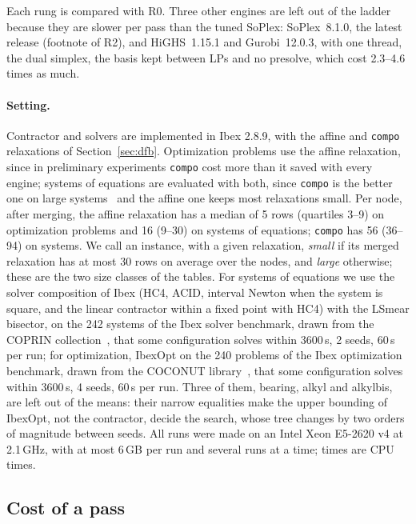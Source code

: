 \documentclass[11pt]{article}
\theoremstyle{definition}
\theoremstyle{remark}
\begin{document}
Each rung is compared with R0. Three other engines are left out of the
ladder because they are slower per pass than the tuned SoPlex: SoPlex~8.1.0,
the latest release (footnote of R2), and HiGHS~1.15.1 and Gurobi~12.0.3, with
one thread, the dual simplex, the basis kept between LPs and no presolve,
which cost 2.3--4.6 times as much.

\paragraph{Setting.}
Contractor and solvers are implemented in Ibex 2.8.9, with the affine and
\texttt{compo} relaxations of Section~\ref{sec:dfb}. Optimization
problems use the affine relaxation, since in preliminary experiments
\texttt{compo} cost more than it saved with every engine; systems of
equations are evaluated with both, since \texttt{compo} is the better one on
large systems~\cite{araya2025hybridizing} and the affine one keeps most
relaxations small.
Per node, after merging, the affine relaxation has a median of 5 rows
(quartiles 3--9) on optimization problems and 16 (9--30) on systems of
equations; \texttt{compo} has 56 (36--94) on systems. We call an instance, with a given
relaxation, \emph{small} if its merged relaxation has at most 30 rows on
average over the nodes, and \emph{large} otherwise; these are the two size
classes of the tables. For systems of
equations we use the solver composition of Ibex (HC4, ACID, interval Newton
when the system is square, and the linear contractor within a fixed point with
HC4) with the LSmear bisector, on the 242 systems of the Ibex solver benchmark,
drawn from the COPRIN collection~\cite{coprin},
that some configuration solves within 3600\,s, 2 seeds, 60\,s per run; for
optimization, IbexOpt on the 240 problems of the Ibex optimization benchmark,
drawn from the COCONUT library~\cite{shcherbina2003benchmarking},
that some configuration solves within 3600\,s, 4 seeds, 60\,s per run. Three
of them, bearing, alkyl and alkylbis, are left out of the means: their narrow
equalities make the upper bounding of IbexOpt, not the contractor, decide the
search, whose tree changes by two orders of magnitude between seeds. All runs
were made on an Intel Xeon E5-2620 v4 at 2.1\,GHz, with at most 6\,GB per run
and several runs at a time; times are CPU times.


\subsection{Cost of a pass}\label{sec:bank}
\end{document}
